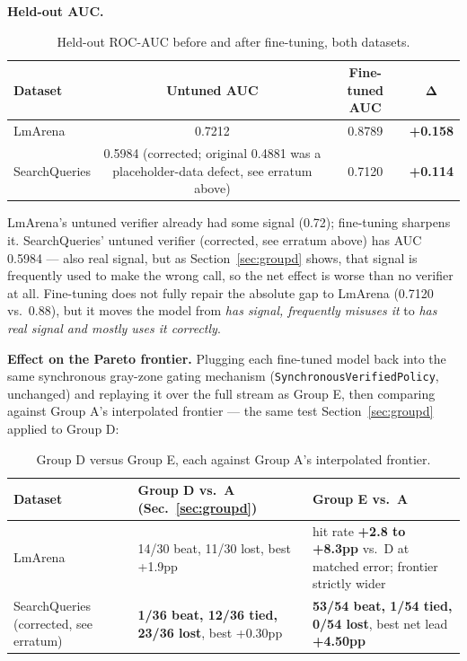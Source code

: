 \documentclass[11pt]{article}
\newenvironment{fittab}{\begin{lrbox}{\fittabbox}}{\end{lrbox}%
  \ifdim\wd\fittabbox>\linewidth\resizebox{\linewidth}{!}{\usebox{\fittabbox}}\else\usebox{\fittabbox}\fi}
\begin{document}
\textbf{Held-out AUC.}

\begin{table}[h]
\centering
\small
\begin{fittab}\begin{tabular}{@{}lccc@{}}
\toprule
\textbf{Dataset} & \textbf{Untuned AUC} & \textbf{Fine-tuned AUC} & $\boldsymbol{\Delta}$ \\
\midrule
LmArena & 0.7212 & 0.8789 & \textbf{+0.158} \\
SearchQueries & 0.5984 (corrected; original 0.4881 was a placeholder-data defect, see erratum above) & 0.7120 & \textbf{+0.114} \\
\bottomrule
\end{tabular}\end{fittab}
\caption{Held-out ROC-AUC before and after fine-tuning, both datasets.}
\end{table}

LmArena's untuned verifier already had some signal (0.72); fine-tuning sharpens it. SearchQueries' untuned verifier (corrected, see erratum above) has AUC 0.5984 --- also real signal, but as Section~\ref{sec:groupd} shows, that signal is frequently used to make the wrong call, so the net effect is worse than no verifier at all. Fine-tuning does not fully repair the absolute gap to LmArena (0.7120 vs.\ 0.88), but it moves the model from \emph{has signal, frequently misuses it} to \emph{has real signal and mostly uses it correctly}.

\textbf{Effect on the Pareto frontier.} Plugging each fine-tuned model back into the same synchronous gray-zone gating mechanism (\texttt{Synchronous\allowbreak{}Verified\allowbreak{}Policy}, unchanged) and replaying it over the full stream as Group E, then comparing against Group A's interpolated frontier --- the same test Section~\ref{sec:groupd} applied to Group D:

\begin{table}[h]
\centering
\small
\begin{fittab}\begin{tabular}{@{}lp{}p{}@{}}
\toprule
\textbf{Dataset} & \textbf{Group D vs.\ A (Sec.~\ref{sec:groupd})} & \textbf{Group E vs.\ A} \\
\midrule
LmArena & 14/30 beat, 11/30 lost, best +1.9pp & hit rate \textbf{+2.8 to +8.3pp} vs.\ D at matched error; frontier strictly wider \\
SearchQueries (corrected, see erratum) & \textbf{1/36 beat, 12/36 tied, 23/36 lost}, best +0.30pp & \textbf{53/54 beat, 1/54 tied, 0/54 lost}, best net lead \textbf{+4.50pp} \\
\bottomrule
\end{tabular}\end{fittab}
\caption{Group D versus Group E, each against Group A's interpolated frontier.}
\end{table}
\end{document}
